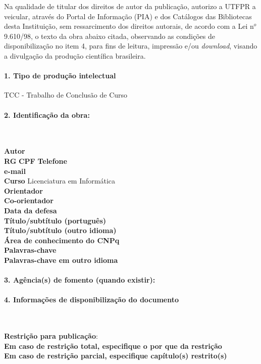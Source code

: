 \documentclass[12pt]{article}
\begin{document}
Na qualidade de titular dos direitos de autor da publicação, autorizo a UTFPR a veicular, através do Portal de Informação (PIA) e dos Catálogos das Bibliotecas desta Instituição, sem ressarcimento dos direitos autorais, de acordo com a Lei n${}^{o}$ 9.610/98, o texto da obra abaixo citada, observando as condições de disponibilização no item 4, para fins de leitura, impressão e/ou \textit{download}, visando a divulgação da produção científica brasileira.

\paragraph{1. Tipo de produção intelectual} TCC - Trabalho de Conclusão de Curso 

\paragraph{2. Identificação da obra:} {~}
\begin{flushleft}
\linespread{1.3} \selectfont
\noindent\textbf{Autor} \discente \\ 
\textbf{RG} \rg \hspace{2em} \textbf{CPF} \cpf \hspace{2em}  \textbf{Telefone} \telefonecomDDD \\
\textbf{e-mail} \email \\
\textbf{Curso} Licenciatura em Informática \\
\textbf{Orientador} \proforientador\\
\textbf{Co-orientador} \profcoorientador\\
\textbf{Data da defesa} \\
\textbf{Título/subtítulo (português)} \titulotrabalho\\
\textbf{Título/subtítulo (outro idioma)} \titulotrabalhoIngles\\
\textbf{Área de conhecimento do CNPq} \areaCNPQ\\
\textbf{Palavras-chave} \palavraschaves\\
\textbf{Palavras-chave em outro idioma} \palavraschavesIngles\\
\end{flushleft}

\paragraph{3. Agência(s) de fomento (quando existir):} \agenciafomento
\paragraph{4. Informações de disponibilização do documento} {~}
\begin{flushleft}
\linespread{1.3} \selectfont
\textbf{Restrição para publicação}: \restricaopublicacao\\
\textbf{Em caso de restrição total, especifique o por que da restrição} \restricaoTotal\\
\textbf{Em caso de restrição parcial, especifique capítulo(s) restrito(s)} \restricaoParcial
\end{flushleft}
\end{document}
